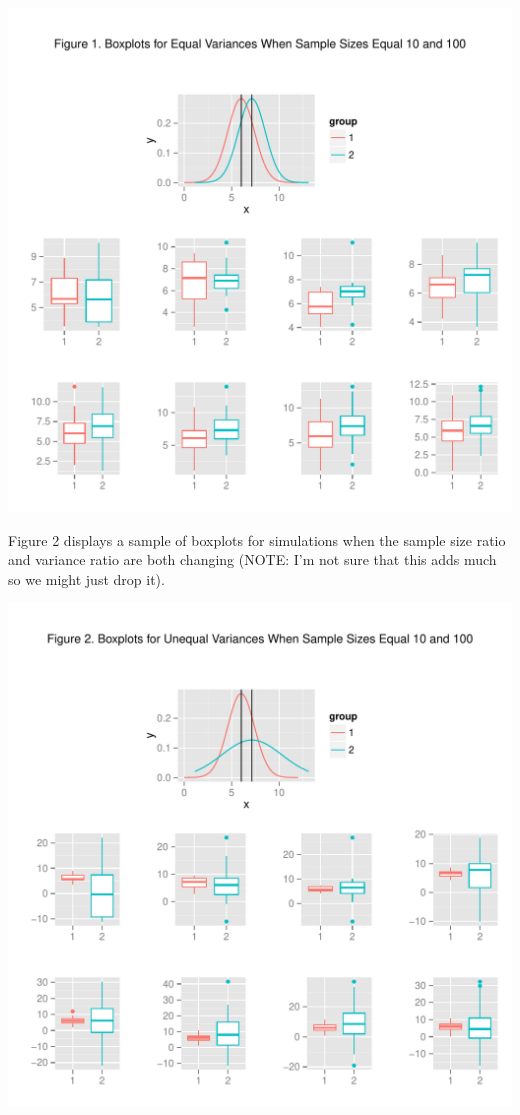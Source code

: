 \documentclass[man,a4paper,noextraspace]{apa6}\usepackage[]{graphicx}\usepackage[]{color}
\makeatletter
\def\maxwidth{ %
  \ifdim\Gin@nat@width>\linewidth
    \linewidth
  \else
    \Gin@nat@width
  \fi
}
\newenvironment{knitrout}{}{} %
\makeatother
\begin{document}
\begin{knitrout}
\color{fgcolor}
\includegraphics[width=\maxwidth]{figure/varEqualBoxplots} 

\end{knitrout}

Figure 2 displays a sample of boxplots for simulations when the sample size ratio and variance ratio are both changing (NOTE: I'm not sure that this adds much so we might just drop it).

\begin{knitrout}
\color{fgcolor}
\includegraphics[width=\maxwidth]{figure/varDifferentBoxplots} 

\end{knitrout}
\end{document}
